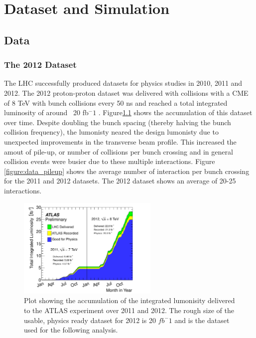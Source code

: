 \chapter[Dataset and Simulation][Dataset and Simulation]{Dataset and Simulation}
\label{chapter:data} 
\section{Data}

\subsection{The 2012 Dataset} 

The LHC successfully produced datasets for physics studies in 2010, 2011 and 2012. The 2012 
proton-proton dataset was delivered with collisions with a CME of 8 TeV with bunch collisions
every 50 ns and reached a total integrated luminosity of around ~20 fb$^-1$ \cite{Aad:2013ucp}.
Figure\ref{figure:data_lumi} shows the accumulation of this dataset over time. 
Despite doubling the bunch spacing (thereby halving the bunch collision frequency), the lumonisty neared
the design lumonisty due to unexpected improvements in the transverse beam profile\cite{Carli:1424362}. This increased
the amout of pile-up, or number of collisions per bunch crossing and in general collision
events were busier due to these multiple interactions. Figure \ref{figure:data_pileup} shows
the average number of interaction per bunch crossing for the 2011 and 2012 datasets. The 2012
dataset shows an average of 20-25 interactions. 
\begin{figure}[!t]
\centering 
\includegraphics[width=0.60\textwidth]{figs/intlumivstime2011-2012DQ.pdf}
\caption{ Plot showing the accumulation of the integrated lumonisity delivered to the ATLAS experiment over 2011 and 2012. The rough size of the usable, physics ready dataset for 2012 is 20 $fb^-1$ and is the dataset used for the following analysis. 
}
\label{figure:data_lumi}
\end{figure}


